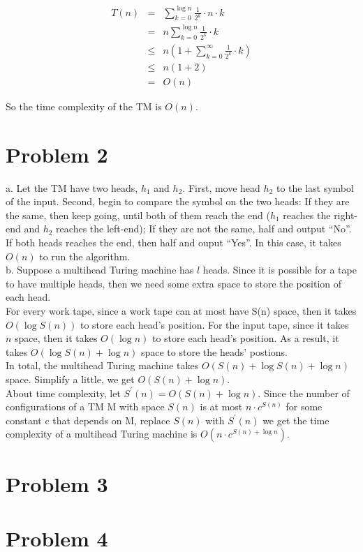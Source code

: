\documentclass[12pt]{article}
\begin{document}
\begin{eqnarray}
  T(n) &=&    \sum_{k = 0}^{\log n} {\frac {1}{2^k} \cdot n \cdot k}
              \nonumber \\
       &=&  n \sum_{k = 0}^{\log n} {\frac {1}{2^k} \cdot k} 
              \nonumber \\
       &\leq& n (1 + \sum_{k = 0}^{\infty} {\frac {1}{2^k} \cdot k}) 
              \nonumber \\
       &\leq& n (1 + 2) \nonumber \\
       &=&    O(n)
\end{eqnarray}

So the time complexity of the TM is $O(n)$.

\section{Problem 2}
a. Let the TM have two heads, $h_1$ and $h_2$. First, move head
$h_2$ to the last symbol of the input. Second, begin to compare the
symbol on the two heads: If they are the same, then keep going, until
both of them reach the end ($h_1$ reaches the right-end and $h_2$
reaches the left-end); If they are not the same, half and output
``No''. If both heads reaches the end, then half and ouput ``Yes''. In
this case, it takes $O(n)$ to run the algorithm.\\

b. Suppose a multihead Turing machine has $l$ heads. Since it is
possible for a tape to have multiple heads, then we need some extra
space to store the position of each head.\\

For every work tape, since a work tape can at most have S(n) space,
then it takes $O(\log {S(n)})$ to store each head's position. For the
input tape, since it takes $n$ space, then it takes $O(\log {n})$ to
store each head's position. As a result, it takes $O(\log {S(n)} +
\log {n})$ space to store the heads' postions.\\

In total, the multihead Turing machine takes $O(S(n) + \log {S(n)} +
\log {n})$ space. Simplify a little, we get $O(S(n) + \log {n})$.\\

About time complexity, let $S^{'}(n) = O(S(n) + \log {n})$. Since
the number of configurations of a TM M with space $S(n)$ is at most
$n \cdot c^{S(n)}$ for some constant c that depends on M, replace
$S(n)$ with $S^{'}(n)$ we get the time complexity of a multihead
Turing machine is $O(n \cdot c^{S(n) + \log {n}})$.

\section{Problem 3}



\section{Problem 4}


\appendix
\appendixpage
\addappheadtotoc
\end{document}
